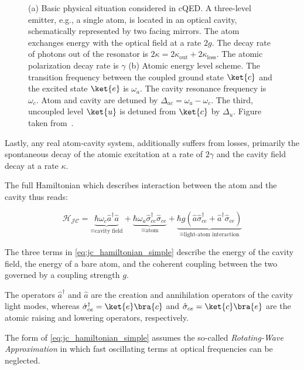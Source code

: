\begin{figure}[htbp]
	\centering
	
	\caption{(a) Basic physical situation considered in cQED. A three-level emitter, e.g., a single atom, is located in an optical cavity, schematically represented by two facing mirrors. The atom exchanges energy with the optical field at a rate $2g$. The decay rate of photons out of the resonator is $2\kappa = 2\kappa_{\text{out}}+2\kappa_{\text{loss}}$. The atomic polarization decay rate is $\gamma$ (b) Atomic energy level scheme. The transition frequency between the coupled ground state $\ket{c}$ and the excited state $\ket{e}$ is $\omega_a$. The cavity resonance frequency is $\omega_c$. Atom and cavity are detuned by $\Delta_{ac} = \omega_a - \omega_c$. The third, uncoupled level $\ket{u}$ is detuned from $\ket{c}$ by $\Delta_u$. Figure taken from~\cite{RempeReiserer2015}.}
\end{figure}


Lastly, any real atom-cavity system, additionally suffers from losses, primarily the spontaneous decay of the atomic excitation at a rate of $2\gamma$ and the cavity field decay at a rate $\kappa$.

The full Hamiltonian which describes interaction between the atom and the cavity thus reads: \cite{JaynesCummings1963}

\begin{equation}
	\mathcal{H_{JC}} = \underbrace{\hbar\omega_{c} \hat{a}^\dag\hat{a}}_{\widehat{=}\text{cavity field}} + \underbrace{\hbar\omega_a \hat{\sigma}_{ce}^\dag\hat{\sigma}_{ce}}_{\widehat{=}\text{atom}} + \underbrace{\hbar g(\hat{a}\hat{\sigma}_{ce}^\dag + \hat{a}^\dag\hat{\sigma}_{ce})}_{\widehat{=}\text{light-atom interaction}}
	\label{eq:jc_hamiltonian_simple}
\end{equation}

The three terms in \eqref{eq:jc_hamiltonian_simple} describe the energy of the cavity field, the energy of a bare atom, and the coherent coupling between the two governed by a coupling strength $g$.

The operators $\hat{a}^\dag$ and $\hat{a}$ are the creation and annihilation operators of the cavity light modes, whereas $\hat{\sigma}_{ce}^{\dag}=\ket{e}\bra{c}$ and $\hat{\sigma}_{ce}=\ket{c}\bra{e}$ are the atomic raising and lowering operators, respectively.

The form of \eqref{eq:jc_hamiltonian_simple} assumes the so-called \textit{Rotating-Wave Approximation} in which fast oscillating terms at optical frequencies can be neglected.


